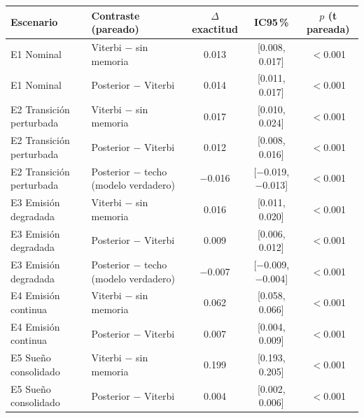 \begin{tabular}{llccc}
\toprule
\textbf{Escenario} & \textbf{Contraste (pareado)} & \textbf{$\Delta$ exactitud} & \textbf{IC95\,\%} & \textbf{$p$ (t pareada)} \\
\midrule
E1 Nominal & Viterbi $-$ sin memoria & 0.013 & [0.008, 0.017] & $<$0.001 \\
E1 Nominal & Posterior $-$ Viterbi & 0.014 & [0.011, 0.017] & $<$0.001 \\
E2 Transición perturbada & Viterbi $-$ sin memoria & 0.017 & [0.010, 0.024] & $<$0.001 \\
E2 Transición perturbada & Posterior $-$ Viterbi & 0.012 & [0.008, 0.016] & $<$0.001 \\
E2 Transición perturbada & Posterior $-$ techo (modelo verdadero) & \ensuremath{-}0.016 & [\ensuremath{-}0.019, \ensuremath{-}0.013] & $<$0.001 \\
E3 Emisión degradada & Viterbi $-$ sin memoria & 0.016 & [0.011, 0.020] & $<$0.001 \\
E3 Emisión degradada & Posterior $-$ Viterbi & 0.009 & [0.006, 0.012] & $<$0.001 \\
E3 Emisión degradada & Posterior $-$ techo (modelo verdadero) & \ensuremath{-}0.007 & [\ensuremath{-}0.009, \ensuremath{-}0.004] & $<$0.001 \\
E4 Emisión continua & Viterbi $-$ sin memoria & 0.062 & [0.058, 0.066] & $<$0.001 \\
E4 Emisión continua & Posterior $-$ Viterbi & 0.007 & [0.004, 0.009] & $<$0.001 \\
E5 Sueño consolidado & Viterbi $-$ sin memoria & 0.199 & [0.193, 0.205] & $<$0.001 \\
E5 Sueño consolidado & Posterior $-$ Viterbi & 0.004 & [0.002, 0.006] & $<$0.001 \\
\bottomrule
\end{tabular}
